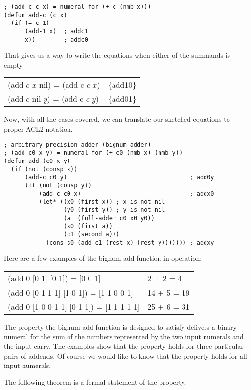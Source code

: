 \label{add-c-defun}
\begin{Verbatim}
; (add-c c x) = numeral for (+ c (nmb x)))
(defun add-c (c x)
  (if (= c 1)
      (add-1 x)  ; addc1
      x))        ; addc0
\end{Verbatim}

That gives us a way to write the equations when either of the summands is empty.
\begin{tabular}{ll}
(add $c$ $x$ nil) = (add-c $c$ $x$)   & \{add10\} \\
(add $c$ nil $y$) = (add-c $c$ $y$)   & \{add01\} \\
\end{tabular}

Now, with all the cases covered, we can translate our sketched equations
to proper ACL2 notation.

\label{bignum-add-defun}
\begin{Verbatim}
; arbitrary-precision adder (bignum adder)
; (add c0 x y) = numeral for (+ c0 (nmb x) (nmb y))
(defun add (c0 x y)
  (if (not (consp x))
      (add-c c0 y)                                   ; add0y
      (if (not (consp y))
          (add-c c0 x)                               ; addx0
          (let* ((x0 (first x)) ; x is not nil
                 (y0 (first y)) ; y is not nil
                 (a  (full-adder c0 x0 y0))
                 (s0 (first a))
                 (c1 (second a)))
            (cons s0 (add c1 (rest x) (rest y))))))) ; addxy

\end{Verbatim}

Here are a few examples of the bignum add function in operation:

\begin{tabular}{ll}
(add 0 [0 1] [0 1]) = [0 0 1]               &  2 + 2 = 4  \\
(add 0 [0 1 1 1] [1 0 1]) = [1 1 0 0 1]     & 14 + 5 = 19 \\
(add 0 [1 0 0 1 1] [0 1 1]) = [1 1 1 1 1]   & 25 + 6 = 31 \\
\end{tabular}

The property the bignum add function is designed to satisfy
delivers a binary numeral for the sum of
the numbers represented by the two input numerals and the input carry.
The examples show that the property holds for three
particular pairs of addends.
Of course we would like to know that the property
holds for all input numerals.

The following theorem is a formal statement of the property.

